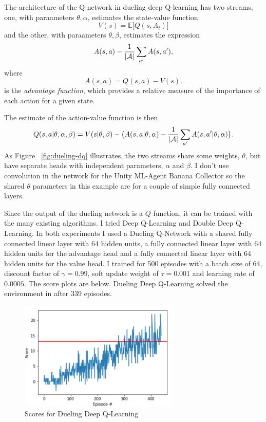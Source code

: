 \documentclass[tog]{acmsiggraph}
\begin{document}
The architecture of the Q-network in dueling deep Q-learning has two streams, one, with paraameters $\theta, \alpha$, estimates the state-value function:
$$V(s) = \mathbb{E}\big[Q(s,A_t)\big]$$
and the other, with paraameters $\theta, \beta$,  estimates the expression 
$$A(s,a) - \frac{1}{{\cal |A|}}\sum_{a'}A(s, a'),$$
where 
$$A(s,a) = Q(s,a) - V(s).$$
is the {\em advantage function}, which provides a relative measure of the importance of each action for a given state.

The estimate of the action-value function is then
$$Q(s,a|\theta, \alpha, \beta) = V(s|\theta, \beta) - \big(A(s,a|\theta, \alpha) - \frac{1}{{\cal |A|}}\sum_{a'}A(s, a'|\theta, \alpha)\big).$$
As Figure ~\ref{fig:dueling-dq} illustrates, the two streams share some weights, $\theta$, but have separate heads with independent parameters, $\alpha$ and $\beta$.  I don't use convolution in the network for the Unity ML-Agent Banana Collector so the shared $\theta$ parameters in this example are for a couple of simple fully connected layers.

Since the output of the dueling network is a $Q$ function, it can be trained with the many existing algorithms. I tried Deep Q-Learning and Double Deep Q-Learning. 
In both experiments I used a Dueling Q-Network with a shared fully connected linear layer with 64 hidden units, a fully connected linear layer with 64 hidden units for
the advantage head and a fully connected linear layer with 64 hidden units for the value head.  I trained for 500 episodes with a batch size of 64, discount factor of $\gamma = 0.99$, soft update weight of $\tau = 0.001$ and learning rate of $0.0005$.  The score plots are below.  Dueling Deep Q-Learning solved the environment in after 339 episodes.

\begin{figure}[h]
	\centering
	\includegraphics[width=3.0in]{images/dueling-dqn-scores}
	\caption{Scores for Dueling Deep Q-Learning}
	\label{fig:dueling-dqn-scores}
\end{figure}
\end{document}
